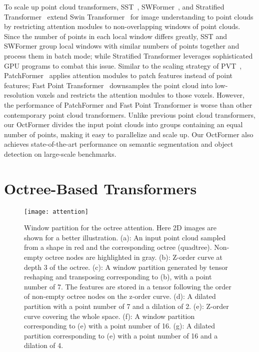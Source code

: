 \documentclass[acmtog,screen,authorversion]{acmart}
\begin{document}
To scale up point cloud transformers, SST~\cite{Fan2022}, SWFormer~\cite{Sun2022}, and Stratified Transformer~\cite{Lai2022} extend Swin Transformer~\cite{Liu2021a} for image understanding to point clouds by restricting attention modules to non-overlapping windows of point clouds.
Since the number of points in each local window differs greatly, SST and SWFormer group local windows with similar numbers of points together and process them in batch mode;
while Stratified Transformer leverages sophisticated GPU programs to combat this issue.
Similar to the scaling strategy of PVT~\cite{Wang2021c}, PatchFormer~\cite{Cheng2022} applies attention modules to patch features instead of point features;
Fast Point Transformer~\cite{Park2022} downsamples the point cloud into low-resolution voxels and restricts the attention modules to those voxels.
However, the performance of PatchFormer and Fast Point Transformer is worse than other contemporary point cloud transformers.
Unlike previous point cloud transformers, our OctFormer divides the input point clouds into groups containing an equal number of points, making it easy to parallelize and scale up.
Our OctFormer also achieves state-of-the-art performance on semantic segmentation and object detection on large-scale benchmarks.

 \section{Octree-Based Transformers} \label{sec:method}

\begin{figure*}[ht]
  \centering
  \texttt{[image: attention]}
  \caption{Window partition for the octree attention.
  Here 2D images are shown for a better illustration. 
  (a): An input point cloud sampled from a shape in red and the corresponding octree (quadtree). 
  Non-empty octree nodes are highlighted in gray.
  (b): Z-order curve at depth 3 of the octree.
  (c): A window partition generated by tensor reshaping and transposing corresponding to (b), with a point number of 7.
  The features are stored in a tensor following the order of non-empty octree nodes on the z-order curve.
  (d): A dilated partition with a point number of 7 and a dilation of 2.
  (e): Z-order curve covering the whole space.
  (f): A window partition corresponding to (e) with a point number of 16.
  (g): A dilated partition corresponding to (e) with a point number of 16 and a dilation of 4.
  }
  \label{fig:attention}
\end{figure*}
\end{document}
